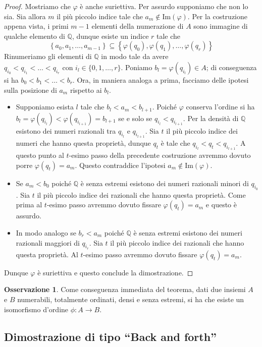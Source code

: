 \documentclass[12pt,a4paper,openright]{report}
\newcommand{\Q}{\mathbb{Q}} %
\newcommand{\0}{\setminus\{0\}} %
\theoremstyle{definition}
\newtheorem{oss}[defn]{Osservazione}
\theoremstyle{plain}
\begin{document}
\begin{proof}
    Mostriamo che $\varphi$ è anche suriettiva. Per assurdo supponiamo che non lo sia. Sia allora $m$ il più piccolo indice tale che $a_m \notin \mathrm{Im}(\varphi)$. Per la costruzione appena vista, i primi $m-1$ elementi della numerazione di $A$ sono immagine di qualche elemento di $\Q$, dunque esiste un indice $r$ tale che
    \[\left\{a_0,a_1,\ldots,a_{m-1}\right\}\subseteq \left\{\varphi(q_0),\varphi(q_1),\ldots,\varphi(q_r)\right\}\]
    Rinumeriamo gli elementi di $\Q$ in modo tale da avere $q_{i_0}<q_{i_1}<\ldots<q_{i_r} \mbox{ con } i_l \in \{0,1,\ldots,r\}$. Poniamo $b_l=\varphi(q_{i_l}) \in A$; di conseguenza si ha $b_0<b_1<\ldots<b_r$. Ora, in maniera analoga a prima, facciamo delle ipotesi sulla posizione di $a_m$ rispetto ai $b_l$.
    \begin{itemize}
    \item Supponiamo esista $l$ tale che $b_l<a_m<b_{l+1}$. Poiché $\varphi$ conserva l'ordine si ha $b_l=\varphi(q_{i_l})<\varphi(q_{i_{l+1}})=b_{l+1}$ se e solo se $q_{i_l}<q_{i_{l+1}}$. Per la densità di $\Q$ esistono dei numeri razionali tra $q_{i_l}$ e $q_{i_{l+1}}$. Sia $t$ il più piccolo indice dei numeri che hanno questa proprietà, dunque $q_t$ è tale che $q_{i_l}<q_t<q_{i_{l+1}}$. A questo punto al $t$-esimo passo della precedente costruzione avremmo dovuto porre $\varphi(q_t)=a_m$. Questo contraddice l'ipotesi $a_m \notin \mathrm{Im}(\varphi)$.
    \item Se $a_m<b_0$ poiché $\Q$ è senza estremi esistono dei numeri razionali minori di $q_{i_0}$. Sia $t$ il più piccolo indice dei razionali che hanno questa proprietà. Come prima al $t$-esimo passo avremmo dovuto fissare $\varphi(q_t)=a_m$ e questo è assurdo.
    \item In modo analogo se $b_r<a_m$ poiché $\Q$ è senza estremi esistono dei numeri razionali maggiori di $q_{i_r}$. Sia $t$ il più piccolo indice dei razionali che hanno questa proprietà. Al $t$-esimo passo avremmo dovuto fissare $\varphi(q_t)=a_m$.
    \end{itemize}
    Dunque $\varphi$ è suriettiva e questo conclude la dimostrazione.
\end{proof}
\begin{oss}
    Come conseguenza immediata del teorema, dati due insiemi $A$ e $B$ numerabili, totalmente ordinati, densi e senza estremi, si ha che esiste un isomorfismo d'ordine $\phi:A\rightarrow B$.
\end{oss}

\subsection{Dimostrazione di tipo ``Back and forth''}
\end{document}

